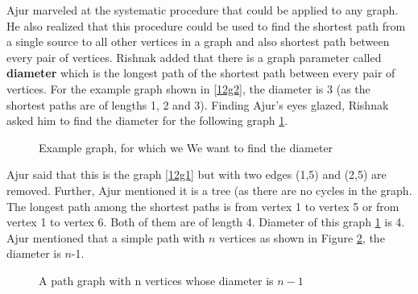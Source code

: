 Ajur marveled at the systematic procedure that could be applied to any graph. He also realized that this procedure could be used to find the shortest path from a single source to all other vertices in a graph and also shortest path between every pair of vertices. Rishnak added that there is a graph parameter called \textbf{diameter} which is the longest path of the shortest path between every pair of vertices. For the example graph shown in \ref{12g2}, the diameter is 3 (as the shortest paths are of lengths 1, 2 and 3). Finding Ajur's eyes glazed, Rishnak asked him to find the diameter for the following graph \ref{12g3}.  

\begin{figure}
\begin{center}
\caption{ Example graph, for which we We want to find the diameter }\label{12g3}
\end{center}
\end{figure}

Ajur said that this is the graph \ref{12g1} but with two edges (1,5) and (2,5) are removed. Further, Ajur mentioned it is a tree (as there are no cycles in the graph. The longest path among the shortest paths is from vertex 1 to vertex 5 or from vertex 1 to vertex 6. Both of them are of length 4. Diameter of this graph \ref{12g3} is 4. Ajur mentioned that a simple path with $n$ vertices as shown in Figure \ref{12g4}, the diameter is $n$-1.

\begin{figure}
\begin{center}
\caption{ A path graph with n vertices whose diameter is $n-1$ }\label{12g4}
\end{center}
\end{figure}

